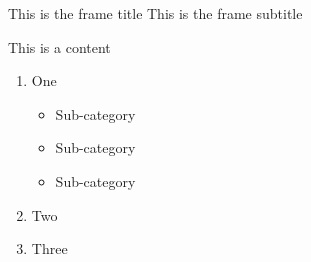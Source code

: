 \documentclass{beamer}
\begin{document}
\begin{frame}
\end{frame}



\begin{frame}
  {This is the frame title}
  {This is the frame subtitle}

  This is a content

  \begin{enumerate}
  \item One
    \begin{itemize}
    \item Sub-category
      \vspace{-0.1cm}  %
    \item Sub-category
      \vspace{0.5cm}  %
    \item Sub-category
    \end{itemize}
  \item Two
  \item Three
  \end{enumerate}
\end{frame}


\end{document}

